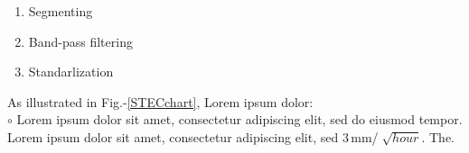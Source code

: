 \documentclass[a0,portrait]{a0poster}
\begin{document}
\begin{minipage}[c]{\linewidth}
\begin{framed}
\begin{multicols}{2}
\begin{enumerate}
\item Segmenting
\item Band-pass filtering
\item Standarlization
\end{enumerate}
As illustrated in Fig.-\ref{STECchart}, Lorem ipsum dolor:\\
\hspace{0.1cm}$\circ$ Lorem ipsum dolor sit amet, consectetur adipiscing elit, sed do eiusmod tempor.\\
Lorem ipsum dolor sit amet, consectetur adipiscing elit, sed  3\,mm/$\sqrt[]{hour}$. The.
\color{Black}

\end{multicols}
\end{framed}
\end{minipage}
\end{document}
